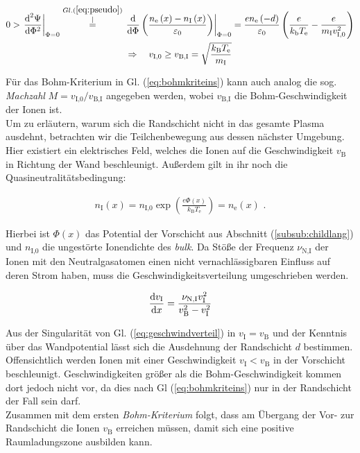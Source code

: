 \documentclass[numbers=noenddot,a4paper,notitlepage,twoside,BCOR15mm]{scrbook}
\newcommand{\diff}{\textnormal{d}}
\newcommand{\ix}[1]{_\text{#1}}
\newcommand{\tilt}[1]{\textit{#1}}
\begin{document}
				\begin{align}
					0>\left.\frac{\diff^{2}\Psi}{\diff\Phi^{2}}\right|_{\Phi=0}\overset{Gl. (\ref{eq:pseudo})}{\overset{\mid}{=}}\left.\frac{\diff}{\diff\Phi}\left(\frac{n\ix{e}\left(x\right)-n\ix{I}\left(x\right)}{\varepsilon\ix{0}}\right)\right|_{\Phi=0}&=\frac{en\ix{e}\left(-d\right)}{\varepsilon\ix{0}}\left(\frac{e}{k\ix{b}T\ix{e}}-\frac{e}{m\ix{I}v\ix{I,0}^{2}}\right) \label{eq:beding} \\
					\Rightarrow \quad v\ix{I,0}\ge v\ix{B,I}=\sqrt{\frac{k\ix{B}T\ix{e}}{m\ix{I}}}& \label{eq:bohmkriteins}
				\end{align}


			Für das Bohm-Kriterium in Gl. (\ref{eq:bohmkriteins}) kann auch analog die sog. \tilt{Machzahl} $M=v\ix{I,0}/v\ix{B,I}$ angegeben werden, wobei $v\ix{B,I}$ die Bohm-Geschwindigkeit der Ionen ist.\\
			Um zu erläutern, warum sich die Randschicht nicht in das gesamte Plasma ausdehnt, betrachten wir die Teilchenbewegung aus dessen nächster Umgebung. Hier existiert ein elektrisches Feld, welches die Ionen auf die Geschwindigkeit $v\ix{B}$ in Richtung der Wand beschleunigt. Außerdem gilt in ihr noch die Quasineutralitätsbedingung:

				\begin{align}
					n\ix{I}\left(x\right)=n\ix{I,0}\exp\left(\frac{e\Phi\left(x\right)}{k\ix{B}T\ix{e}}\right)=n\ix{e}\left(x\right)\,\, . \label{eq:bohmquasineutral}
				\end{align}

			Hierbei ist $\Phi\left(x\right)$ das Potential der Vorschicht aus Abschnitt (\ref{subsub:childlang}) und $n\ix{I,0}$ die ungestörte Ionendichte des \tilt{bulk}. Da Stöße der Frequenz $\nu\ix{N,I}$ der Ionen mit den Neutralgasatomen einen nicht vernachlässigbaren Einfluss auf deren Strom haben, muss die Geschwindigkeitsverteilung umgeschrieben werden.

				\begin{align}
					\frac{\diff v\ix{I}}{\diff x}=\frac{\nu\ix{N,I}v\ix{I}^2}{v\ix{B}^2-v\ix{I}^2} \label{eq:geschwindverteil}
				\end{align}

			Aus der Singularität von Gl. (\ref{eq:geschwindverteil}) in $v\ix{I}=v\ix{B}$ und der Kenntnis über das Wandpotential lässt sich die Ausdehnung der Randschicht $d$ bestimmen. Offensichtlich werden Ionen mit einer Geschwindigkeit $v\ix{I}<v\ix{B}$ in der Vorschicht beschleunigt. Geschwindigkeiten größer als die Bohm-Geschwindigkeit kommen dort jedoch nicht vor, da dies nach Gl (\ref{eq:bohmkriteins}) nur in der Randschicht der Fall sein darf. \\
			Zusammen mit dem ersten \tilt{Bohm-Kriterium} folgt, dass am Übergang der Vor- zur Randschicht die Ionen $v\ix{B}$ erreichen müssen, damit sich eine positive Raumladungszone ausbilden kann.
\end{document}
